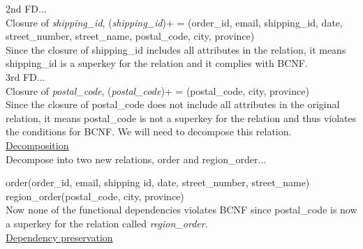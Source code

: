 \documentclass[a4 paper]{article}
\begin{document}
\noindent 2nd FD...\\
\indent Closure of \emph{shipping\_id}, (\emph{shipping\_id})+ = (order\_id, email, shipping\_id, date, street\_number, street\_name, postal\_code, city, province)\\
\indent Since the closure of shipping\_id includes all attributes in the relation, it means shipping\_id is a superkey for the relation and it complies with BCNF.\\

\noindent 3rd FD...\\
\indent Closure of \emph{postal\_code}, (\emph{postal\_code})+ = (postal\_code, city, province)\\
\indent Since the closure of postal\_code does not include all attributes in the original relation, it means postal\_code is not a superkey for the relation and thus violates the conditions for BCNF. We will need to decompose this relation.\\

\noindent\underline{Decomposition}\\
Decompose into two new relations, order and region\_order...

order(order\_id, email, shipping id, date, street\_number, street\_name)\\
\indent region\_order(postal\_code, city, province)\\

\noindent Now none of the functional dependencies violates BCNF since postal\_code is now a superkey for the relation called \emph{region\_order}.\\

\noindent\underline{Dependency preservation}\\
\end{document}

